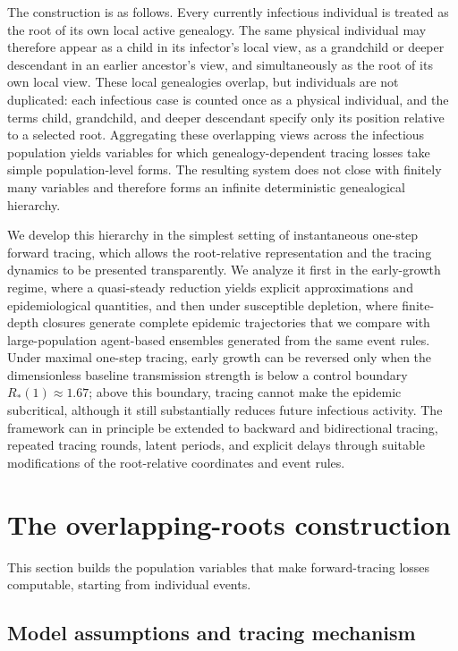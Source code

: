 \documentclass[review,12pt]{elsarticle}
\numberwithin{equation}{section}
\theoremstyle{remark}
\begin{document}
The construction is as follows. Every currently infectious individual is treated as the root of its own local active genealogy. The same physical individual may therefore appear as a child in its infector's local view, as a grandchild or deeper descendant in an earlier ancestor's view, and simultaneously as the root of its own local view. These local genealogies overlap, but individuals are not duplicated: each infectious case is counted once as a physical individual, and the terms child, grandchild, and deeper descendant specify only its position relative to a selected root. Aggregating these overlapping views across the infectious population yields variables for which genealogy-dependent tracing losses take simple population-level forms. The resulting system does not close with finitely many variables and therefore forms an infinite deterministic genealogical hierarchy.

We develop this hierarchy in the simplest setting of instantaneous one-step forward tracing, which allows the root-relative representation and the tracing dynamics to be presented transparently. We analyze it first in the early-growth regime, where a quasi-steady reduction yields explicit approximations and epidemiological quantities, and then under susceptible depletion, where finite-depth closures generate complete epidemic trajectories that we compare with large-population agent-based ensembles generated from the same event rules. Under maximal one-step tracing, early growth can be reversed only when the dimensionless baseline transmission strength is below a control boundary $R_*(1)\approx1.67$; above this boundary, tracing cannot make the epidemic subcritical, although it still substantially reduces future infectious activity. The framework can in principle be extended to backward and bidirectional tracing, repeated tracing rounds, latent periods, and explicit delays through suitable modifications of the root-relative coordinates and event rules.

\section{The overlapping-roots construction}\label{sec2}

This section builds the population variables that make forward-tracing losses computable, starting from individual events.

\subsection{Model assumptions and tracing mechanism}\label{subsec2.1}
\end{document}
